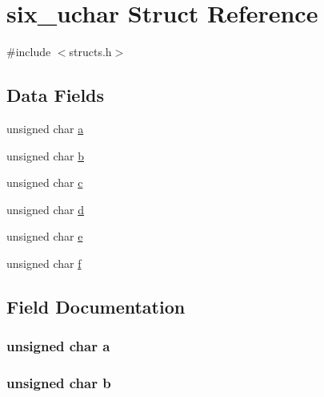 \hypertarget{structsix__uchar}{}\section{six\+\_\+uchar Struct Reference}
\label{structsix__uchar}


{\ttfamily \#include $<$structs.\+h$>$}

\subsection*{Data Fields}
\begin{DoxyCompactItemize}
\item 
unsigned char \hyperlink{structsix__uchar_a24420a9beaac7cee08b5e255a4c29db1}{a}
\item 
unsigned char \hyperlink{structsix__uchar_a41cede1b4c0d05cff170ad5761f70964}{b}
\item 
unsigned char \hyperlink{structsix__uchar_a089aacf63ed94ae0e667bb8f6db3e853}{c}
\item 
unsigned char \hyperlink{structsix__uchar_aef7bd9bb1f716afb151a4b4206d468f3}{d}
\item 
unsigned char \hyperlink{structsix__uchar_a78b0af8eb57f2f240016ee37529c6f47}{e}
\item 
unsigned char \hyperlink{structsix__uchar_a7ceb8bf372a716e22ab056d1b7df49e7}{f}
\end{DoxyCompactItemize}


\subsection{Field Documentation}
\subsubsection[{\texorpdfstring{a}{a}}]{\setlength{\rightskip}{0pt plus 5cm}unsigned char a}\hypertarget{structsix__uchar_a24420a9beaac7cee08b5e255a4c29db1}{}\label{structsix__uchar_a24420a9beaac7cee08b5e255a4c29db1}
\subsubsection[{\texorpdfstring{b}{b}}]{\setlength{\rightskip}{0pt plus 5cm}unsigned char b}\hypertarget{structsix__uchar_a41cede1b4c0d05cff170ad5761f70964}{}\label{structsix__uchar_a41cede1b4c0d05cff170ad5761f70964}
